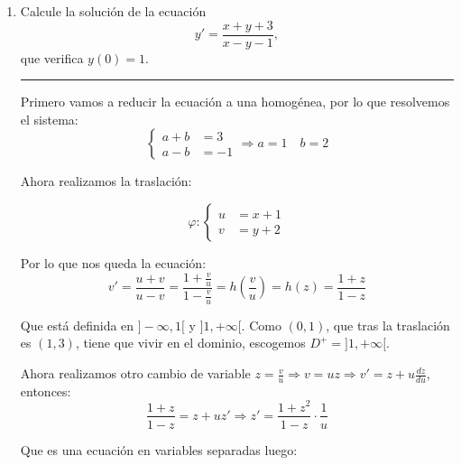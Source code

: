 \documentclass[12pt]{article}
\newcommand{\solution}[1]{\text{\fbox{$#1$}}}
\DeclareMathOperator\arctanh{arctanh}
\begin{document}
\begin{enumerate}
Podemos aplicar variables separadas:
\[
\frac{dv}{dt}=-\frac{k}{m}v^2+g\Longrightarrow \int\frac{dv}{-\frac{k}{m}v^2+g}=\int dt \Longrightarrow \frac{1}{g} \int\frac{dv}{-\frac{k}{mg}v^2+1}=\int dt
\]

Por simplicidad, hacemos $\alpha=\frac{k}{mg}$:
\[
\frac{1}{g}\int\frac{dv}{1-(\frac{v}{\alpha})^2}=\frac{\sqrt{\alpha}}{g}\arctanh\left(\frac{v}{\sqrt{\alpha}}\right) =t+C \Longrightarrow v =\sqrt{\alpha}\tanh\left((t+C)\frac{g}{\sqrt{\alpha}}\right)
\]

Usando la condición inicial $v(0)=0$ tenemos que $C=0$. Por lo que nos queda, en explícitas:
\[
v =\sqrt{\alpha}\tanh\left(\frac{tg}{\sqrt{\alpha}}\right) \Longrightarrow \solution{ v(t) =\sqrt{\alpha}\tanh\left(\frac{tg}{\sqrt{\alpha}}\right) }
\]

Y si queremos saber el comportamiento a largo plazo, hacemos $t\longrightarrow +\infty$ obteniendo que: 
\[
\solution{\displaystyle \lim_{t \to \infty}v(t)=\sqrt{\alpha}=\sqrt{\frac{k}{mg}}}
\]

\newpage
\hrule
\item Calcule la solución de la ecuación
\[
y'=\frac{x+y+3}{x-y-1},
\]
que verifica $y(0)=1$.
\hrule

Primero vamos a reducir la ecuación a una homogénea, por lo que resolvemos el sistema:
$$
\left \{ \begin{array}{ll}
a + b & = 3 \\
a - b & = -1
\end{array}
\right. \Longrightarrow a=1 \quad b=2
$$

Ahora realizamos la traslación:

\[
\varphi : \left \{ \begin{array}{ll}
u & = x+1 \\
v & = y+2
\end{array}
\right. 
\]

Por lo que nos queda la ecuación:
\[
v'=\frac{u+v}{u-v}=\frac{1+\frac{v}{u}}{1-\frac{v}{u}}=h\left(\frac{v}{u}\right)=h(z)=\frac{1+z}{1-z}
\]

Que está definida en $]-\infty, 1[$ y $]1,+\infty[$. Como $(0,1)$, que tras la traslación es $(1,3)$, tiene que vivir en el dominio, escogemos $D^+=]1,+\infty[$.

Ahora realizamos otro cambio de variable $z=\frac{v}{u} \Longrightarrow v=uz \Longrightarrow v'=z+u\frac{dz}{du}$, entonces:
\[
\frac{1+z}{1-z}=z+uz' \Longrightarrow z'=\frac{1+z^2}{1-z}\cdot\frac{1}{u}
\]

Que es una ecuación en variables separadas luego:


\end{enumerate}
\end{document}

